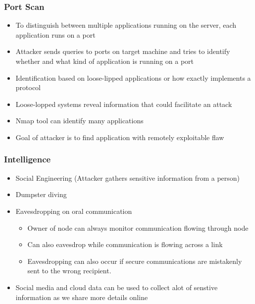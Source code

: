 \documentclass[twoside]{article}
\begin{document}
\subsubsection{Port Scan}
\begin{itemize}
\item To distinguish between multiple applications running on the server, each application runs on a port
\item Attacker sends queries to ports on target machine and tries to identify whether and what kind of application is running on a port
\item Identification based on loose-lipped applications or how exactly implements a protocol
\item Loose-lopped systems reveal information that could facilitate an attack
\item Nmap tool can identify many applications
\item Goal of attacker is to find application with remotely exploitable flaw
\end{itemize}

\subsubsection{Intelligence}
\begin{itemize}
\item Social Engineering (Attacker gathers sensitive information from a person)
\item Dumpster diving
\item Eavesdropping on oral communication
\begin{itemize}
\item Owner of node can always monitor communication flowing through node
\item Can also eavesdrop while communication is flowing across a link 
\item Eavesdropping can also occur if secure communications are mistakenly sent to the wrong recipient.  
\end{itemize}
\item Social media and cloud data can be used to collect alot of senstive information as we share more details online
\end{itemize}
\end{document}
